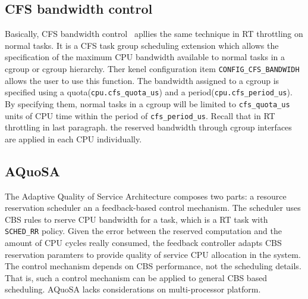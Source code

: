 \subsection{CFS bandwidth control\label{sec:RelatedWork_CFS}}

Basically, CFS bandwidth control~\cite{cfs-bwc} apllies the same technique 
in RT throttling on normal tasks. It is a CFS task group scheduling 
extension which allows the specification of the maximum CPU bandwidth
available to normal tasks in a cgroup or cgroup hierarchy. Ther kenel
configuration item \texttt{CONFIG\_CFS\_BANDWIDH} allows the user to use
this function. The bandwidth assigned to a cgroup is specified using a 
quota(\texttt{cpu.cfs\_quota\_us}) and a period(\texttt{cpu.cfs\_period\_us}).
By specifying them, normal tasks in a cgroup will be limited to 
\texttt{cfs\_quota\_us} units of CPU time within the period of 
\texttt{cfs\_period\_us}. Recall that in RT throttling in last paragraph.
the reserved bandwidth through cgroup interfaces are applied in each CPU
individually.

\subsection{AQuoSA\label{sec:RelatedWork_AQuoSA}}

The Adaptive Quality of Service Architecture composes two parts: 
a resource reservation scheduler an a feedback-based
control mechanism. The scheduler uses CBS rules to rserve CPU bandwidth for
a task, which is a RT task with \texttt{SCHED\_RR} policy.
Given the error between the reserved computation and the amount of CPU cycles
really consumed, the feedback controller adapts CBS reservation paramters to
provide quality of service CPU allocation in the system.
The control mechanism depends on CBS performance, not the scheduling details.
That is, such a control mechanism can be applied to general CBS based 
scheduling. AQuoSA lacks considerations on multi-processor platform.
  
